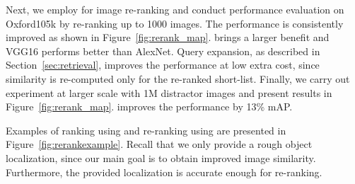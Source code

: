 Next, we employ \deeploc for image re-ranking and conduct performance evaluation on Oxford105k by re-ranking up to 1000 images.
The performance is consistently improved as shown in Figure~\ref{fig:rerank_map}.
\rfv brings a larger benefit and VGG16 performs better than AlexNet.
Query expansion, as described in Section~\ref{sec:retrieval}, improves the performance at low extra cost, since similarity is re-computed only for the re-ranked short-list.
Finally, we carry out experiment at larger scale with 1M distractor images and present results in Figure~\ref{fig:rerank_map}. \deeploc improves the performance by 13\% mAP.

Examples of ranking using \gfv and re-ranking using \deeploc are presented in Figure~\ref{fig:rerankexample}.
Recall that we only provide a rough object localization, since our main goal is to obtain improved image similarity.
Furthermore, the provided localization is accurate enough for re-ranking.

